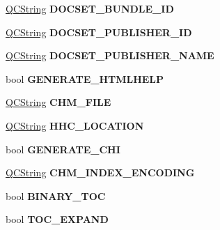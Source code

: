 \begin{DoxyCompactItemize}
\mbox{\hyperlink{class_q_c_string}{Q\+C\+String}} {\bfseries D\+O\+C\+S\+E\+T\+\_\+\+B\+U\+N\+D\+L\+E\+\_\+\+ID}
\item 
\mbox{\label{class_config_values_af61accd94f8eaaf12a729a0b6c4b057f}} 
\mbox{\hyperlink{class_q_c_string}{Q\+C\+String}} {\bfseries D\+O\+C\+S\+E\+T\+\_\+\+P\+U\+B\+L\+I\+S\+H\+E\+R\+\_\+\+ID}
\item 
\mbox{\label{class_config_values_a0602f113902b1439c4f75e81f287c4cb}} 
\mbox{\hyperlink{class_q_c_string}{Q\+C\+String}} {\bfseries D\+O\+C\+S\+E\+T\+\_\+\+P\+U\+B\+L\+I\+S\+H\+E\+R\+\_\+\+N\+A\+ME}
\item 
\mbox{\label{class_config_values_a70298de15c1451d0ac56c088facf74cc}} 
bool {\bfseries G\+E\+N\+E\+R\+A\+T\+E\+\_\+\+H\+T\+M\+L\+H\+E\+LP}
\item 
\mbox{\label{class_config_values_ade9f4e047b661fba9a70eb2fc11e9114}} 
\mbox{\hyperlink{class_q_c_string}{Q\+C\+String}} {\bfseries C\+H\+M\+\_\+\+F\+I\+LE}
\item 
\mbox{\label{class_config_values_ad7bacd99c56c826dc85557b7c7ae7f73}} 
\mbox{\hyperlink{class_q_c_string}{Q\+C\+String}} {\bfseries H\+H\+C\+\_\+\+L\+O\+C\+A\+T\+I\+ON}
\item 
\mbox{\label{class_config_values_a6e4e2130cd9bec97ea3f0c87c5cea88a}} 
bool {\bfseries G\+E\+N\+E\+R\+A\+T\+E\+\_\+\+C\+HI}
\item 
\mbox{\label{class_config_values_a8036aa85d929f9f696da63d68974e891}} 
\mbox{\hyperlink{class_q_c_string}{Q\+C\+String}} {\bfseries C\+H\+M\+\_\+\+I\+N\+D\+E\+X\+\_\+\+E\+N\+C\+O\+D\+I\+NG}
\item 
\mbox{\label{class_config_values_ac44141012e71d2bdf5a02ee2106ddd44}} 
bool {\bfseries B\+I\+N\+A\+R\+Y\+\_\+\+T\+OC}
\item 
\mbox{\label{class_config_values_aeec1d62be09431b3be39f0a19eed4716}} 
bool {\bfseries T\+O\+C\+\_\+\+E\+X\+P\+A\+ND}
\item 
\mbox{\label{class_config_values_a79b870f8b83d9ff125926d3c19ed14cc}} 

\end{DoxyCompactItemize}
